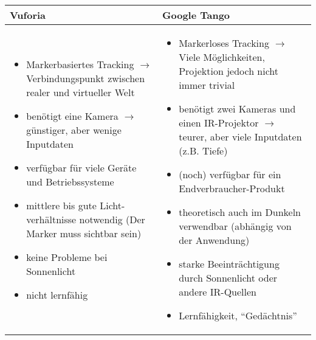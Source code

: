\begin{table}[h]
	\centering
	\begin{tabular}{|p{4cm}|p{4cm}|}
		\hline
		\textbf{Vuforia} & \textbf{Google Tango}\\
		\hline
		\begin{itemize}
			\setlength\itemsep{0.5em}
			\raggedright
			\item Markerbasiertes Tracking\newline
			$\rightarrow$ Verbindungspunkt zwischen realer und virtueller Welt
			\item benötigt eine Kamera\newline 
			$\rightarrow$ günstiger, aber wenige Inputdaten\newline
			\item verfügbar für viele Geräte und Betriebssysteme
			\item mittlere bis gute Licht-verhältnisse notwendig (Der Marker muss sichtbar sein)
			\item keine Probleme bei Sonnenlicht\newline
			\item nicht lernfähig
		\end{itemize}
		 & 
		 \begin{itemize}
		 	\setlength\itemsep{0.5em}
		 	\raggedright
		 	\item Markerloses Tracking\newline
		 	$\rightarrow$ Viele Möglichkeiten, Projektion jedoch nicht immer trivial
		 	\item benötigt zwei Kameras und einen IR-Projektor $\rightarrow$ teurer, aber viele Inputdaten (z.B. Tiefe)
		 	\item (noch) verfügbar für ein Endverbraucher-Produkt
		 	\item theoretisch auch im Dunkeln verwendbar (abhängig von der Anwendung) \newline
		 	\item starke Beeinträchtigung durch Sonnenlicht oder andere IR-Quellen
		 	\item Lernfähigkeit, "`Gedächtnis"'
		 \end{itemize}\\
		\hline
	\end{tabular}
\end{table}